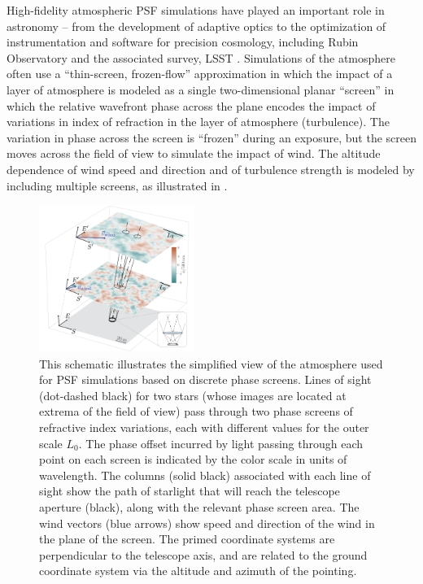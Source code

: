 \documentclass[twocolumn,twocolappendix]{openjournal}
\begin{document}
High-fidelity atmospheric PSF simulations have played an important role in astronomy -- from the development of adaptive optics \citep{jolissaint_synthetic_2010, srinath_creating_2015, madurowicz_characterization_2018} to the optimization of instrumentation and software for precision cosmology, including Rubin Observatory and the associated survey, LSST  \citep{jee_toward_2011, chang_atmospheric_2012, peterson_simulation_2015, the_lsst_dark_energy_science_collaboration_lsst_2021}.
Simulations of the atmosphere often use a ``thin-screen, frozen-flow'' approximation in which the impact of a layer of atmosphere is modeled as a single two-dimensional planar ``screen'' in which the relative wavefront phase across the plane encodes the impact of variations in index of refraction in the layer of atmosphere (turbulence).  
The variation in phase across the screen is ``frozen'' during an exposure, but the screen moves across the field of view to simulate the impact of wind. 
The altitude dependence of wind speed and direction and of turbulence strength is modeled by including multiple screens, as illustrated in .

\begin{figure}
\includegraphics[width=0.45\textwidth]{f1_sim_schematic.png}
\caption{
    This schematic illustrates the simplified view of the atmosphere used for PSF simulations based on discrete phase screens. 
    Lines of sight (dot-dashed black) for two stars (whose images are located at extrema of the field of view) pass through two phase screens of \vk refractive index variations, each with different values for the outer scale $L_0$. 
    The phase offset incurred by light passing through each point on each screen is indicated by the color scale in units of wavelength.
    The columns (solid black) associated with each line of sight show the path of starlight that will reach the telescope aperture (black), along with the relevant phase screen area. 
    The wind vectors (blue arrows) show speed and direction of the wind in the plane of the screen.
    The primed coordinate systems are perpendicular to the telescope axis, and are related to the ground coordinate system via the altitude and azimuth of the pointing.
    \label{fig:schematic}
    }
\end{figure}
\end{document}
